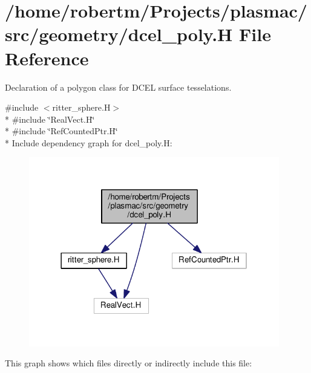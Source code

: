 \hypertarget{dcel__poly_8H}{}\section{/home/robertm/\+Projects/plasmac/src/geometry/dcel\+\_\+poly.H File Reference}
\label{dcel__poly_8H}


Declaration of a polygon class for D\+C\+EL surface tesselations.  


{\ttfamily \#include $<$ritter\+\_\+sphere.\+H$>$}\\*
{\ttfamily \#include \char`\"{}Real\+Vect.\+H\char`\"{}}\\*
{\ttfamily \#include \char`\"{}Ref\+Counted\+Ptr.\+H\char`\"{}}\\*
Include dependency graph for dcel\+\_\+poly.\+H\+:\nopagebreak
\begin{figure}[H]
\begin{center}
\leavevmode
\includegraphics[width=310pt]{dcel__poly_8H__incl}
\end{center}
\end{figure}
This graph shows which files directly or indirectly include this file\+:\nopagebreak
